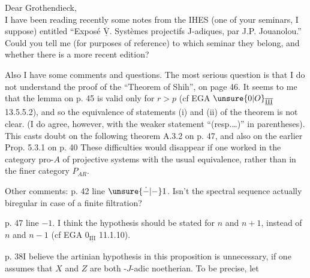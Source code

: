 \noindent Dear Grothendieck,\\

I have been reading recently some notes from the IHES (one of your seminars, I suppose) entitled ``Exposé \(\overline{\underline{\mathrm{V}}}\). Systèmes
\reversemarginpar\margin{\hfill\rule{0.4pt}{1.6\baselineskip}}\normalmarginpar%
projectifs J-adiques, par J.P. Jouanolou.'' Could you tell me (for purposes of reference) to which seminar they belong, and whether there is a more recent edition?

Also I have some comments and questions. The most serious question is that I do not understand the proof of the ``Theorem of Shih'',  on page 46. It seems to me that the lemma on p. 45 is valid only for \(r>p\) (cf EGA \(\unsure{0|O}_{\overline{\underline{\mathrm{III}}}}\) 13.5.5.2), and so  the equivalence of statements (i) and (ii) of the theorem is not clear. (I do agree, however, with the weaker statement ``(resp.\ldots)'' in parentheses). This casts doubt on the following theorem A.3.2 on p. 47, and also on the earlier Prop. 5.3.1 on p. 40 These difficulties would disappear if one worked  in the category \(\mathrm{pro}\text{-}A\) \margin{\unsure{:}} of projective systems with the usual equivalence, rather than in the  finer category \(P_{AR}\).

Other comments: p. 42 line \(\unsure{\dot{-}|{-}}1\). Isn't the spectral sequence actually biregular in case of a finite filtration?

p. 47 line \(-1\). I think the hypothesis should be stated for \(n\) and \(n+1\), instead of \(n\) and \(n-1\) (cf EGA \(0_{\overline{\underline{\mathrm{III}}}}\) 11.1.10).
\clearpage
{}

\noindent p. 38\quad I believe the artinian hypothesis in this proposition is unnecessary, if one assumes that \(X\) and \(Z\) are both -\(J\)-adic noetherian. To be precise, let

